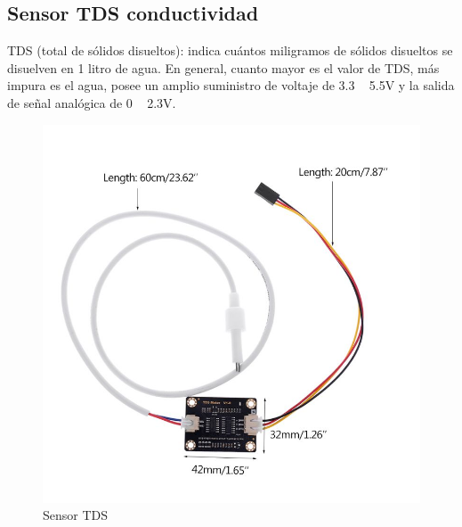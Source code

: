 \documentclass[10pt,a4paper]{article}
\begin{document}
\begin{multicols}{2}
\subsection{Sensor TDS conductividad}
TDS (total de sólidos disueltos): indica cuántos miligramos de sólidos disueltos se disuelven en 1 litro de agua. En general, cuanto mayor es el valor de TDS, más impura es el agua, posee un amplio suministro de voltaje de 3.3 ~ 5.5V y la salida de señal analógica de 0 ~ 2.3V.
\begin{figure}[H]
\centering
\includegraphics[scale=0.2]{TDS.jpg}
\caption{Sensor TDS}
\end{figure}

\end{multicols}
\end{document}
